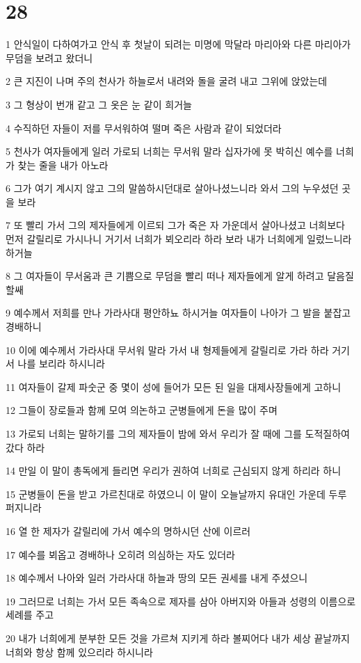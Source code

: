 \chapter{28}

\par 1 안식일이 다하여가고 안식 후 첫날이 되려는 미명에 막달라 마리아와 다른 마리아가 무덤을 보려고 왔더니
\par 2 큰 지진이 나며 주의 천사가 하늘로서 내려와 돌을 굴려 내고 그위에 앉았는데
\par 3 그 형상이 번개 같고 그 옷은 눈 같이 희거늘
\par 4 수직하던 자들이 저를 무서워하여 떨며 죽은 사람과 같이 되었더라
\par 5 천사가 여자들에게 일러 가로되 너희는 무서워 말라 십자가에 못 박히신 예수를 너희가 찾는 줄을 내가 아노라
\par 6 그가 여기 계시지 않고 그의 말씀하시던대로 살아나셨느니라 와서 그의 누우셨던 곳을 보라
\par 7 또 빨리 가서 그의 제자들에게 이르되 그가 죽은 자 가운데서 살아나셨고 너희보다 먼저 갈릴리로 가시나니 거기서 너희가 뵈오리라 하라 보라 내가 너희에게 일렀느니라 하거늘
\par 8 그 여자들이 무서움과 큰 기쁨으로 무덤을 빨리 떠나 제자들에게 알게 하려고 달음질할쌔
\par 9 예수께서 저희를 만나 가라사대 평안하뇨 하시거늘 여자들이 나아가 그 발을 붙잡고 경배하니
\par 10 이에 예수께서 가라사대 무서워 말라 가서 내 형제들에게 갈릴리로 가라 하라 거기서 나를 보리라 하시니라
\par 11 여자들이 갈제 파숫군 중 몇이 성에 들어가 모든 된 일을 대제사장들에게 고하니
\par 12 그들이 장로들과 함께 모여 의논하고 군병들에게 돈을 많이 주며
\par 13 가로되 너희는 말하기를 그의 제자들이 밤에 와서 우리가 잘 때에 그를 도적질하여 갔다 하라
\par 14 만일 이 말이 총독에게 들리면 우리가 권하여 너희로 근심되지 않게 하리라 하니
\par 15 군병들이 돈을 받고 가르친대로 하였으니 이 말이 오늘날까지 유대인 가운데 두루 퍼지니라
\par 16 열 한 제자가 갈릴리에 가서 예수의 명하시던 산에 이르러
\par 17 예수를 뵈옵고 경배하나 오히려 의심하는 자도 있더라
\par 18 예수께서 나아와 일러 가라사대 하늘과 땅의 모든 권세를 내게 주셨으니
\par 19 그러므로 너희는 가서 모든 족속으로 제자를 삼아 아버지와 아들과 성령의 이름으로 세례를 주고
\par 20 내가 너희에게 분부한 모든 것을 가르쳐 지키게 하라 볼찌어다 내가 세상 끝날까지 너희와 항상 함께 있으리라 하시니라


